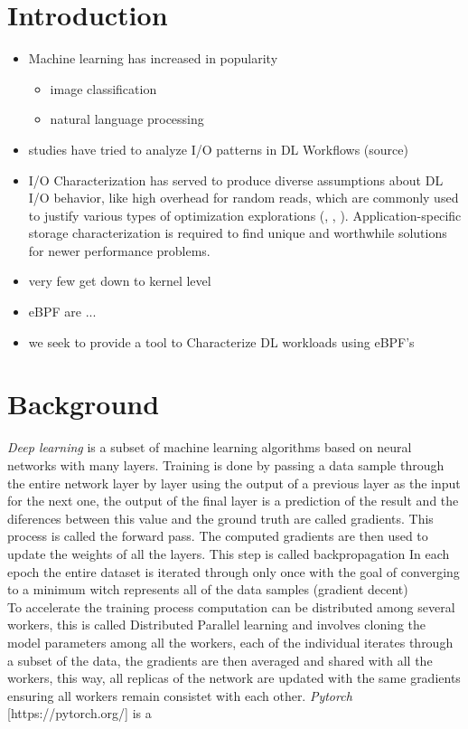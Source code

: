 \documentclass[conference]{IEEEtran}
\begin{document}
\section{Introduction}
\begin{itemize}
    \item Machine learning has increased in popularity
    \begin{itemize}
        \item image classification
        \item natural language processing
    \end{itemize}
    \item studies have tried to analyze I/O patterns in DL Workflows (source)
    \item I/O Characterization has served to produce diverse assumptions about DL I/O behavior, like high overhead for random reads, which are commonly used to justify various types of optimization explorations (\cite{LMDB}, \cite{nvme}, \cite{10.1145/3337821.3337902}). Application-specific storage characterization is required to find unique and worthwhile solutions for newer performance problems.
    \item very few get down to kernel level
    \item eBPF are ...
    \item we seek to provide a tool to Characterize DL workloads using eBPF's
\end{itemize}

\section{Background}

    \textit{Deep learning} is a subset of machine learning algorithms based on neural networks with many layers. Training is done by passing a data sample 
    through the entire network layer by layer using the output of a previous layer as the input for the next one, the output of the final layer is a prediction of the result 
    and the diferences between this value and the ground truth are called gradients. This process is called the forward pass. 
    The computed gradients are then used to update the weights of all the layers. This step is called backpropagation
    In each epoch the entire dataset is iterated through only once with the goal of converging to a minimum witch represents all of the data samples (gradient decent) \\
    To accelerate the training process computation can be distributed among several workers, this is called Distributed Parallel learning and involves cloning
    the model parameters among all the workers, each of the individual iterates through a subset of the data, the gradients are then averaged and shared with all the workers,
    this way, all replicas of the network are updated with the same gradients ensuring all workers remain consistet with each other.
    \textit{Pytorch} [https://pytorch.org/] is a
\end{document}
